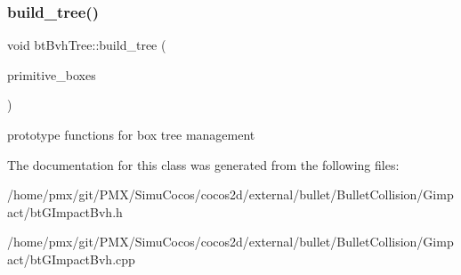 \subsubsection{\texorpdfstring{build\+\_\+tree()}{build\_tree()}\hspace{0.1cm}{\footnotesize\ttfamily [2/2]}}
{\footnotesize\ttfamily void bt\+Bvh\+Tree\+::build\+\_\+tree (\begin{DoxyParamCaption}\item[{\hyperlink{classGIM__BVH__DATA__ARRAY}{G\+I\+M\+\_\+\+B\+V\+H\+\_\+\+D\+A\+T\+A\+\_\+\+A\+R\+R\+AY} \&}]{primitive\+\_\+boxes }\end{DoxyParamCaption})}

prototype functions for box tree management 

The documentation for this class was generated from the following files\+:\begin{DoxyCompactItemize}
\item 
/home/pmx/git/\+P\+M\+X/\+Simu\+Cocos/cocos2d/external/bullet/\+Bullet\+Collision/\+Gimpact/bt\+G\+Impact\+Bvh.\+h\item 
/home/pmx/git/\+P\+M\+X/\+Simu\+Cocos/cocos2d/external/bullet/\+Bullet\+Collision/\+Gimpact/bt\+G\+Impact\+Bvh.\+cpp\end{DoxyCompactItemize}
